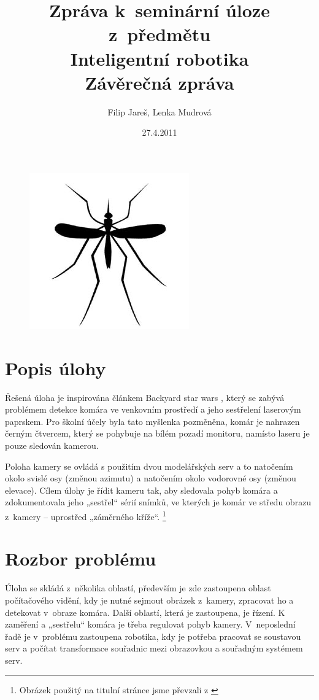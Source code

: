 \documentclass[a4paper,10pt]{article}
\title{Zpráva k~seminární úloze z~předmětu\\ Inteligentní robotika \\ {\small Závěrečná zpráva}}
\author{Filip Jareš, Lenka Mudrová}
\date{27.4.2011}
\begin{document}
\pagestyle{empty}

\maketitle

\begin{figure}[!h]
	\centering
	\includegraphics[width=0.4\columnwidth]{pics/mosquito}
\end{figure}
\newpage

\pagestyle{plain}
\section{Popis úlohy}
		Řešená úloha je inspirována článkem Backyard star wars \cite{zadani}, který se zabývá problémem
		detekce komára ve venkovním prostředí a jeho sestřelení laserovým paprskem. 
		Pro školní účely byla tato myšlenka pozměněna, komár je nahrazen černým čtvercem, který se pohybuje na bílém
		pozadí monitoru, namísto laseru je pouze sledován kamerou.

		Poloha kamery se ovládá s použitím dvou modelářských serv a to  
		natočením okolo svislé osy (změnou azimutu) a natočením okolo vodorovné osy (změnou elevace). Cílem úlohy
		je řídit kameru tak, aby sledovala pohyb komára a zdokumentovala jeho „sestřel“
		sérií snímků, ve kterých je komár ve středu obrazu z~kamery – uprostřed
		„záměrného kříže“. \footnote{Obrázek použitý na titulní stránce jsme převzali z \cite{komar}}

		

\section{Rozbor problému}
		Úloha se skládá z~několika oblastí, především je zde zastoupena oblast
		po\-čí\-ta\-čo\-vé\-ho vidění, kdy je nutné sejmout obrázek z~kamery, zpracovat ho a
		detekovat v~obraze komára. 
		Další oblastí, která je zastoupena, je řízení. K zaměření a „sestřelu“ komára je
		třeba regulovat pohyb kamery.
		V~neposlední řadě je v~problému zastoupena robotika, kdy je potřeba pracovat se
		soustavou serv a počítat transformace souřadnic mezi obrazovkou a souřadným
		systémem serv.
\end{document}
